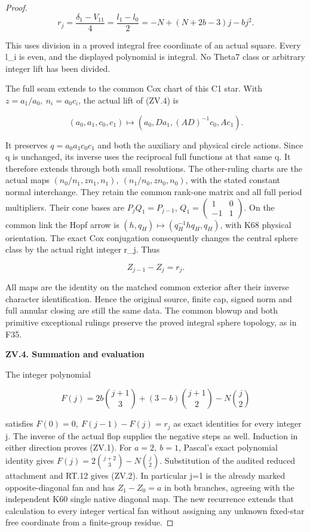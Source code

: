 \begin{proof}
\[
 r_j=\frac{\delta_1-V_{11}}4
       =\frac{l_1-l_0}{2}
       =-N+(N+2b-3)j-bj^2.                         \tag{ZV.11}
\]

This uses division in a proved integral free coordinate of an actual
square. Every l\_i is even, and the displayed polynomial is integral.
No Theta7 class or arbitrary integer lift has been divided.

The full seam extends to the common Cox chart of this C1 star.
With \(z=a_1/a_0,\ n_i=a_0c_i\), the actual lift of (ZV.4) is

\[
 (a_0,a_1,c_0,c_1)\mapsto
       (a_0,Da_1,(AD)^{-1}c_0,Ac_1).                \tag{ZV.12}
\]

It preserves \(q=a_0a_1c_0c_1\) and both the auxiliary and physical circle
actions. Since q is unchanged, its inverse uses the reciprocal full
functions at that same q. It therefore extends through both small
resolutions. The other-ruling charts are the actual maps
\((n_0/n_1,zn_1,n_1),\ (n_1/n_0,zn_0,n_0)\), with the stated constant
normal interchange. They retain the common rank-one matrix and all
full period multipliers. Their cone bases are \(P_jQ_1=P_{j-1}\),
\(Q_1=\left(\begin{smallmatrix}1&0\\-1&1\end{smallmatrix}\right)\). On the common link the Hopf arrow is
\((h,q_H)\mapsto(q_H^{-1}hq_H,q_H)\), with K68 physical orientation.
The exact Cox conjugation consequently changes the central sphere
class by the actual right integer r\_j. Thus

\[
                         Z_{j-1}-Z_j=r_j.          \tag{ZV.13}
\]

All maps are the identity on the matched common exterior after their
inverse character identification. Hence the original source, finite
cap, signed norm and full annular closing are still the same data.
The common blowup and both primitive exceptional rulings preserve
the proved integral sphere topology, as in F35.

\par

\medskip\noindent\textbf{ZV.4. Summation and evaluation}

\par\nopagebreak[4]

The integer polynomial

\[
 F(j)=2b\binom{j+1}{3}+(3-b)\binom{j+1}{2}
                                          -N\binom j2
\]

satisfies \(F(0)=0,\ F(j-1)-F(j)=r_j\) as exact identities for every
integer j. The inverse of the actual flop supplies the negative steps
as well. Induction in either direction proves (ZV.1). For \(a=2,\ b=1\),
Pascal's exact polynomial identity gives \(F(j)=2\binom{j+2}{3}-N\binom j2\).
Substitution of the audited reduced attachment and RT.12 gives (ZV.2).
In particular j=1 is the already marked opposite-diagonal fan and
has \(Z_1-Z_0=a\) in both branches, agreeing with the independent K60
single native diagonal map. The new recurrence extends that
calculation to every integer vertical fan without assigning any
unknown fixed-star free coordinate from a finite-group residue.


\end{proof}

